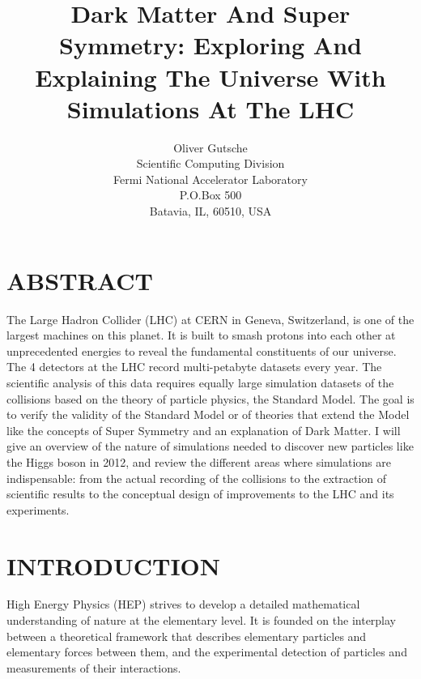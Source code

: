 \documentclass{wscpaperproc}
\theoremstyle{wsc}
\begin{document}
%
%

\title{Dark Matter And Super Symmetry: Exploring And Explaining The Universe With Simulations At The LHC}

\author{Oliver Gutsche\\ [12pt]
Scientific Computing Division \\
Fermi National Accelerator Laboratory\\
P.O.Box 500\\
Batavia, IL, 60510, USA\\
}

\maketitle

\section*{ABSTRACT}
The Large Hadron Collider (LHC) at CERN in Geneva, Switzerland, is one of the largest machines on this planet. It is built to smash protons into each other at unprecedented energies to reveal the fundamental constituents of our universe. The 4 detectors at the LHC record multi-petabyte datasets every year. The scientific analysis of this data requires equally large simulation datasets of the collisions based on the theory of particle physics, the Standard Model. The goal is to verify the validity of the Standard Model or of theories that extend the Model like the concepts of Super Symmetry and an explanation of Dark Matter. I will give an overview of the nature of simulations needed to discover new particles like the Higgs boson in 2012, and review the different areas where simulations are indispensable: from the actual recording of the collisions to the extraction of scientific results to the conceptual design of improvements to the LHC and its experiments.

\section{INTRODUCTION}
\label{sec:intro}
High Energy Physics (HEP) strives to develop a detailed mathematical understanding of nature at the elementary level. It is founded on the interplay between a theoretical framework that describes elementary particles and elementary forces between them, and the experimental detection of particles and measurements of their interactions.
\end{document}
